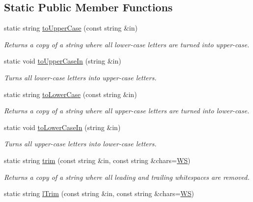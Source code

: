 \subsection*{Static Public Member Functions}
\begin{DoxyCompactItemize}
\item 
static string \hyperlink{classStringUtils_af381aea34f18dc36fc69e94e7bfd129b}{to\-Upper\-Case} (const string \&in)
\begin{DoxyCompactList}\small\item\em Returns a copy of a string where all lower-\/case letters are turned into upper-\/case. \end{DoxyCompactList}\item 
static void \hyperlink{classStringUtils_a99ede460fbe4ffaa860018729006db6b}{to\-Upper\-Case\-In} (string \&in)
\begin{DoxyCompactList}\small\item\em Turns all lower-\/case letters into upper-\/case letters. \end{DoxyCompactList}\item 
static string \hyperlink{classStringUtils_ac41fe1449bd2750f9c59ae9ae4e52ffe}{to\-Lower\-Case} (const string \&in)
\begin{DoxyCompactList}\small\item\em Returns a copy of a string where all upper-\/case letters are turned into lower-\/case. \end{DoxyCompactList}\item 
static void \hyperlink{classStringUtils_a17462d8b525f9e6b14716649a8abfa22}{to\-Lower\-Case\-In} (string \&in)
\begin{DoxyCompactList}\small\item\em Turns all upper-\/case letters into lower-\/case letters. \end{DoxyCompactList}\item 
static string \hyperlink{classStringUtils_afea8320e4d8b1725634faf46e27e9453}{trim} (const string \&in, const string \&chars=\hyperlink{classStringUtils_a2abc03ce0e461cb7efca2166a12fd496}{W\-S})
\begin{DoxyCompactList}\small\item\em Returns a copy of a string where all leading and trailing whitespaces are removed. \end{DoxyCompactList}\item 
static string \hyperlink{classStringUtils_a54535024ab2df497c5aacd7b23e87c7d}{l\-Trim} (const string \&in, const string \&chars=\hyperlink{classStringUtils_a2abc03ce0e461cb7efca2166a12fd496}{W\-S})

\end{DoxyCompactItemize}
